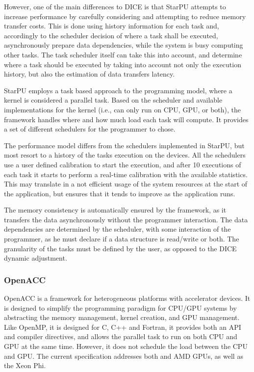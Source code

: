 However, one of the main differences to DICE is that StarPU attempts to increase performance by carefully considering and attempting to reduce memory transfer costs. This is done using history information for each task and, accordingly to the scheduler decision of where a task shall be executed, asynchronously prepare data dependencies, while the system is busy computing other tasks. The task scheduler itself can take this into account, and determine where a task should be executed by taking into account not only the execution history, but also the estimation of data transfers latency.

StarPU employs a task based approach to the programming model, where a kernel is considered a parallel task. Based on the scheduler and available implementations for the kernel (i.e., can only run on CPU, GPU, or both), the framework handles where and how much load each task will compute. It provides a set of different schedulers for the programmer to chose.

The performance model differs from the schedulers implemented in StarPU, but most resort to a history of the tasks execution on the devices. All the schedulers use a user defined calibration to start the execution, and after 10 executions of each task it starts to perform a real-time calibration with the available statistics. This may translate in a not efficient usage of the system resources at the start of the application, but ensures that it tends to improve as the application runs.

The memory consistency is automatically ensured by the framework, as it transfers the data asynchronously without the programmer interaction. The data dependencies are determined by the scheduler, with some interaction of the programmer, as he must declare if a data structure is read/write or both. The granularity of the tasks must be defined by the user, as opposed to the DICE dynamic adjustment.


\subsubsection*{OpenACC}

OpenACC \cite{OpenACC} is a framework for heterogeneous platforms with accelerator devices. It is designed to simplify the programming paradigm for CPU/GPU systems by abstracting the memory management, kernel creation, and GPU management. Like OpenMP, it is designed for C, C++ and Fortran, it provides both an API and compiler directives, and allows the parallel task to run on both CPU and GPU at the same time. However, it does not schedule the load between the CPU and GPU. The current specification addresses both \nvidia and AMD GPUs, as well as the \intel Xeon Phi.

